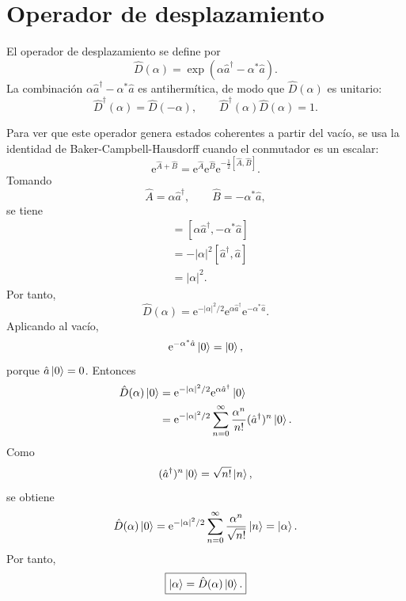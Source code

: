 \documentclass[11pt]{article}
\newcommand{\ee}{\mathrm{e}}
\newcommand{\adag}{\hat a^\dagger}
\begin{document}
\section{Operador de desplazamiento}

El operador de desplazamiento se define por
\begin{equation}
  \hat D(\alpha)
  =
  \exp\left(\alpha\adag-\alpha^*\hat a\right).
\end{equation}
La combinaci\'on $\alpha\adag-\alpha^*\hat a$ es antiherm\'itica, de modo que
$\hat D(\alpha)$ es unitario:
\begin{equation}
  \hat D^\dagger(\alpha)=\hat D(-\alpha),
  \qquad
  \hat D^\dagger(\alpha)\hat D(\alpha)=1.
\end{equation}

Para ver que este operador genera estados coherentes a partir del vac\'io, se
usa la identidad de Baker-Campbell-Hausdorff cuando el conmutador es un
escalar:
\begin{equation}
  \ee^{\hat A+\hat B}
  =
  \ee^{\hat A}\ee^{\hat B}
  \ee^{-\frac12[\hat A,\hat B]}.
\end{equation}
Tomando
\begin{equation}
  \hat A=\alpha\adag,
  \qquad
  \hat B=-\alpha^*\hat a,
\end{equation}
se tiene
\begin{align}
  [\hat A,\hat B]
  &=
  [\alpha\adag,-\alpha^*\hat a]\\
  &=
  -|\alpha|^2[\adag,\hat a]\\
  &=
  |\alpha|^2.
\end{align}
Por tanto,
\begin{equation}
  \hat D(\alpha)
  =
  \ee^{-|\alpha|^2/2}
  \ee^{\alpha\adag}
  \ee^{-\alpha^*\hat a}.
\end{equation}
Aplicando al vac\'io,
\begin{equation}
  \ee^{-\alpha^*\hat a}\ket0=\ket0,
\end{equation}
porque $\hat a\ket0=0$. Entonces
\begin{align}
  \hat D(\alpha)\ket0
  &=
  \ee^{-|\alpha|^2/2}
  \ee^{\alpha\adag}\ket0\\
  &=
  \ee^{-|\alpha|^2/2}
  \sum_{n=0}^{\infty}
  \frac{\alpha^n}{n!}(\adag)^n\ket0.
\end{align}
Como
\begin{equation}
  (\adag)^n\ket0=\sqrt{n!}\ket n,
\end{equation}
se obtiene
\begin{equation}
  \hat D(\alpha)\ket0
  =
  \ee^{-|\alpha|^2/2}
  \sum_{n=0}^{\infty}
  \frac{\alpha^n}{\sqrt{n!}}\ket n
  =
  \ket{\alpha}.
\end{equation}
Por tanto,
\begin{equation}
  \boxed{\ket{\alpha}=\hat D(\alpha)\ket0.}
\end{equation}
\end{document}
